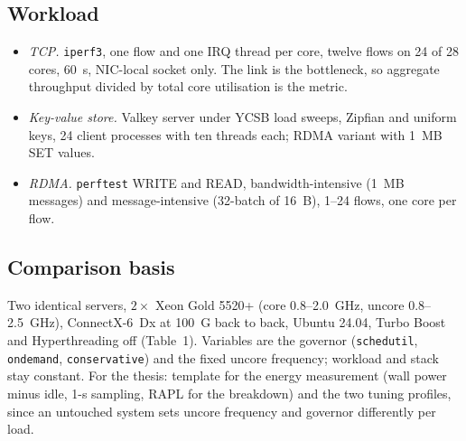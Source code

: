 \documentclass[11pt,a4paper]{article}
\begin{document}
\subsection*{\normalsize\normalfont Workload}
\begin{itemize}
\setlength{\itemsep}{2pt}
\item \emph{TCP.}
\texttt{iperf3}, one flow and one IRQ thread per core, twelve flows on 24 of 28 cores, 60~s, NIC-local socket only.
The link is the bottleneck, so aggregate throughput divided by total core utilisation is the metric.
\item \emph{Key-value store.}
Valkey server under YCSB load sweeps, Zipfian and uniform keys, 24 client processes with ten threads each; RDMA variant with 1~MB SET values.
\item \emph{RDMA.}
\texttt{perftest} WRITE and READ, bandwidth-intensive (1~MB messages) and message-intensive (32-batch of 16~B), 1--24 flows, one core per flow.
\end{itemize}

\subsection*{\normalsize\normalfont Comparison basis}
Two identical servers, $2\times$ Xeon Gold 5520+ (core 0.8--2.0~GHz, uncore 0.8--2.5~GHz), ConnectX-6~Dx at 100~G back to back, Ubuntu 24.04, Turbo Boost and Hyperthreading off (Table~1).
Variables are the governor (\texttt{schedutil}, \texttt{ondemand}, \texttt{conservative}) and the fixed uncore frequency; workload and stack stay constant.
For the thesis: template for the energy measurement (wall power minus idle, 1-s sampling, RAPL for the breakdown) and the two tuning profiles, since an untouched system sets uncore frequency and governor differently per load.
\par
\endgroup
\end{document}
